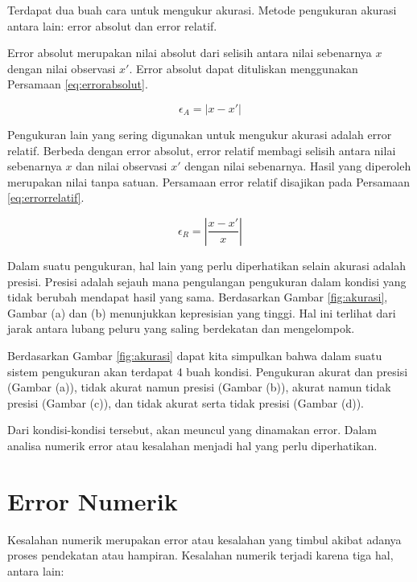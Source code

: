 \documentclass[]{book}
\theoremstyle{definition}
\theoremstyle{definition}
\theoremstyle{definition}
\theoremstyle{remark}
\begin{document}
Terdapat dua buah cara untuk mengukur akurasi. Metode pengukuran akurasi antara lain: error absolut dan error relatif.

Error absolut merupakan nilai absolut dari selisih antara nilai sebenarnya \(x\) dengan nilai observasi \(x'\). Error absolut dapat dituliskan menggunakan Persamaan \eqref{eq:errorabsolut}.

\begin{equation}
   \epsilon_A=\left|x-x'\right|
  \label{eq:errorabsolut}
\end{equation}

Pengukuran lain yang sering digunakan untuk mengukur akurasi adalah error relatif. Berbeda dengan error absolut, error relatif membagi selisih antara nilai sebenarnya \(x\) dan nilai observasi \(x'\) dengan nilai sebenarnya. Hasil yang diperoleh merupakan nilai tanpa satuan. Persamaan error relatif disajikan pada Persamaan \eqref{eq:errorrelatif}.

\begin{equation}
   \epsilon_R=\left|\frac{x-x'}{x}\right|
  \label{eq:errorrelatif}
\end{equation}

Dalam suatu pengukuran, hal lain yang perlu diperhatikan selain akurasi adalah presisi. Presisi adalah sejauh mana pengulangan pengukuran dalam kondisi yang tidak berubah mendapat hasil yang sama. Berdasarkan Gambar \ref{fig:akurasi}, Gambar (a) dan (b) menunjukkan kepresisian yang tinggi. Hal ini terlihat dari jarak antara lubang peluru yang saling berdekatan dan mengelompok.

Berdasarkan Gambar \ref{fig:akurasi} dapat kita simpulkan bahwa dalam suatu sistem pengukuran akan terdapat 4 buah kondisi. Pengukuran akurat dan presisi (Gambar (a)), tidak akurat namun presisi (Gambar (b)), akurat namun tidak presisi (Gambar (c)), dan tidak akurat serta tidak presisi (Gambar (d)).

Dari kondisi-kondisi tersebut, akan meuncul yang dinamakan error. Dalam analisa numerik error atau kesalahan menjadi hal yang perlu diperhatikan.

\hypertarget{numerror}{%
\section{Error Numerik}\label{numerror}}

Kesalahan numerik merupakan error atau kesalahan yang timbul akibat adanya proses pendekatan atau hampiran. Kesalahan numerik terjadi karena tiga hal, antara lain:
\end{document}
